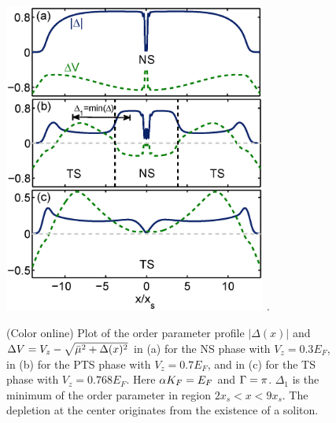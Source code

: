 \documentclass[prl,aps,twocolumn,showpacs, floatfix]{revtex4}
\begin{document}
\begin{widetext}
\setcounter{figure}{0} \renewcommand{\thefigure}{S\arabic{figure}}
\begin{figure}[t]
\includegraphics[width=3.4in]{Sub.eps} .
\caption{(Color online) Plot of the order parameter profile $|\Delta (x)|$
and $\Delta V=V_{z}-\protect\sqrt{\bar{\protect\mu}^{2}+\Delta (x)^{2}}$ in
(a) for the NS phase with $V_{z}=0.3E_{F}$, in (b) for the PTS phase with $%
V_{z}=0.7E_{F}$, and in (c) for the TS phase with $V_{z}=0.768E_{F}$. Here $%
\protect\alpha K_{F}=E_{F}$ and $\Gamma =\protect\pi $. $\Delta _{1}$ is the
minimum of the order parameter in region $2x_{s}<x<9x_{s}$. The depletion at
the center originates from the existence of a soliton.}
\label{Sub}
\end{figure}

\end{widetext}
\end{document}
